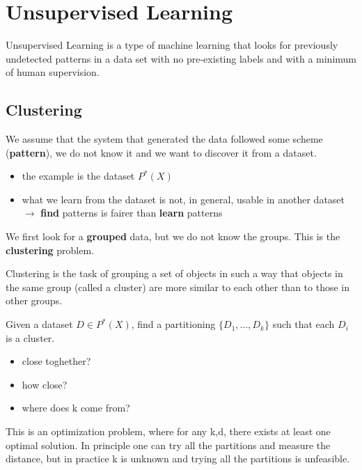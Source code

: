 \chapter{Unsupervised Learning}

\begin{definitionblock}
Unsupervised Learning is a type of machine learning that looks for previously undetected patterns in a data set with no pre-existing labels and with a minimum of human supervision.
\end{definitionblock}

\section{Clustering}

We assume that the system that generated the data followed some scheme (\textbf{pattern}), we do not know it and we want to discover it from a dataset.

\begin{itemize}
    \item the example is the dataset $P^{*}(X)$
    \item what we learn from the dataset is not, in general, usable in another dataset $\to$ \textbf{find} patterns is fairer than \textbf{learn} patterns
\end{itemize}

We first look for a \textbf{grouped} data, but we do not know the groups. This is the \textbf{clustering} problem.

\begin{definitionblock}[Clustering]
Clustering is the task of grouping a set of objects in such a way that objects in the same group (called a cluster) are more similar to each other than to those in other groups.
\end{definitionblock}

Given a dataset $D \in P^*(X)$, find a partitioning $\{D_1,\dots,D_k\}$ such that each $D_i$ is a cluster.

\begin{itemize}
    \item close toghether?
    \item how close?
    \item where does k come from?
\end{itemize}

This is an optimization problem, where for any k,d, there exists at least one optimal solution. In principle one can try all the partitions and measure the distance, but in practice k is unknown and trying all the partitions is unfeasible.

